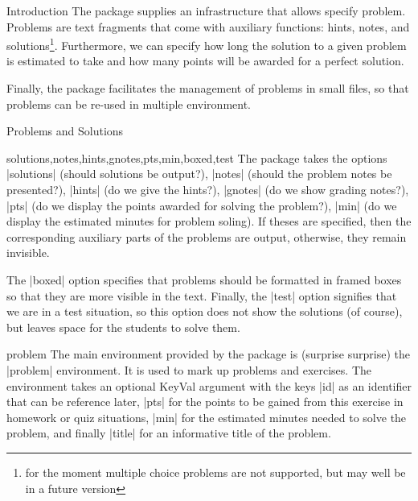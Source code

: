 \begin{sfragment}{Introduction}
  The  package supplies an infrastructure that allows specify problem.  Problems
are text fragments that come with auxiliary functions: hints, notes, and
solutions\footnote{for the moment multiple choice problems are not supported, but may
  well be in a future version}. Furthermore, we can specify how long the solution to a
given problem is estimated to take and how many points will be awarded for a perfect
solution.

Finally, the  package facilitates the management of problems in small files,
so that problems can be re-used in multiple environment. 
\end{sfragment}


\begin{sfragment}{Problems and Solutions}
  
\begin{function}{solutions,notes,hints,gnotes,pts,min,boxed,test}
  The  package takes the options |solutions| (should solutions be output?),
  |notes| (should the problem notes be presented?), |hints| (do we give the hints?),
  |gnotes| (do we show grading notes?), |pts| (do we display the points awarded for
  solving the problem?), |min| (do we display the estimated minutes for problem
  soling). If theses are specified, then the corresponding auxiliary parts of the problems
  are output, otherwise, they remain invisible.

  The |boxed| option specifies that problems should be formatted in framed boxes so that
  they are more visible in the text. Finally, the |test| option signifies that we are in a
  test situation, so this option does not show the solutions (of course), but leaves space
  for the students to solve them.
\end{function}

\begin{environment}{problem}
  The main environment provided by the package is (surprise surprise) the
  |problem| environment. It is used to mark up problems and exercises. The environment
  takes an optional KeyVal argument with the keys |id| as an identifier that can be
  reference later, |pts| for the points to be gained from this exercise in homework or
  quiz situations, |min| for the estimated minutes needed to solve the problem, and
  finally |title| for an informative title of the problem.
\end{environment}


\end{sfragment}
